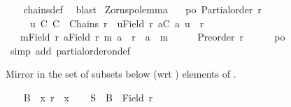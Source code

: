 \begin{isabellebody}
%
\isadelimproof
\ \ %
\endisadelimproof
%
\isatagproof
{}\isamarkupfalse%
\ chains{\isacharunderscore}{\kern0pt}def\ \isamarkupfalse%
\ blast%
\endisatagproof
{\isafoldproof}%
%
\isadelimproof
\isanewline
%
\endisadelimproof
\isanewline
{}\isamarkupfalse%
\ Zorns{\isacharunderscore}{\kern0pt}po{\isacharunderscore}{\kern0pt}lemma{\isacharcolon}{\kern0pt}\isanewline
\ \ \ po{\isacharcolon}{\kern0pt}\ {\isachardoublequoteopen}Partial{\isacharunderscore}{\kern0pt}order\ r{\isachardoublequoteclose}\isanewline
\ \ \ \ \ u{\isacharcolon}{\kern0pt}\ {\isachardoublequoteopen}{\isasymAnd}C{\isachardot}{\kern0pt}\ C\ {\isasymin}\ Chains\ r\ {\isasymLongrightarrow}\ {\isasymexists}u{\isasymin}Field\ r{\isachardot}{\kern0pt}\ {\isasymforall}a{\isasymin}C{\isachardot}{\kern0pt}\ {\isacharparenleft}{\kern0pt}a{\isacharcomma}{\kern0pt}\ u{\isacharparenright}{\kern0pt}\ {\isasymin}\ r{\isachardoublequoteclose}\isanewline
\ \ \ {\isachardoublequoteopen}{\isasymexists}m{\isasymin}Field\ r{\isachardot}{\kern0pt}\ {\isasymforall}a{\isasymin}Field\ r{\isachardot}{\kern0pt}\ {\isacharparenleft}{\kern0pt}m{\isacharcomma}{\kern0pt}\ a{\isacharparenright}{\kern0pt}\ {\isasymin}\ r\ {\isasymlongrightarrow}\ a\ {\isacharequal}{\kern0pt}\ m{\isachardoublequoteclose}\isanewline
%
\isadelimproof
%
\endisadelimproof
%
\isatagproof
{}\isamarkupfalse%
\ {\isacharminus}{\kern0pt}\isanewline
\ \ \isamarkupfalse%
\ {\isachardoublequoteopen}Preorder\ r{\isachardoublequoteclose}\isanewline
\ \ \ \ \isamarkupfalse%
\ po\ \isamarkupfalse%
\ {\isacharparenleft}{\kern0pt}simp\ add{\isacharcolon}{\kern0pt}\ partial{\isacharunderscore}{\kern0pt}order{\isacharunderscore}{\kern0pt}on{\isacharunderscore}{\kern0pt}def{\isacharparenright}{\kern0pt}%
\begin{isamarkuptxt}%
Mirror  in the set of subsets below (wrt ) elements of .%
\end{isamarkuptxt}\isamarkuptrue%
\ \ \isamarkupfalse%
\ {\isacharquery}{\kern0pt}B\ {\isacharequal}{\kern0pt}\ {\isachardoublequoteopen}{\isasymlambda}x{\isachardot}{\kern0pt}\ r{\isasyminverse}\ {\isacharbackquote}{\kern0pt}{\isacharbackquote}{\kern0pt}\ {\isacharbraceleft}{\kern0pt}x{\isacharbraceright}{\kern0pt}{\isachardoublequoteclose}\isanewline
\ \ \isamarkupfalse%
\ {\isacharquery}{\kern0pt}S\ {\isacharequal}{\kern0pt}\ {\isachardoublequoteopen}{\isacharquery}{\kern0pt}B\ {\isacharbackquote}{\kern0pt}\ Field\ r{\isachardoublequoteclose}\isanewline

\end{isabellebody}
